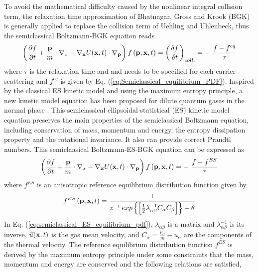 \documentclass{rsproca}%
\begin{document}
To avoid the mathematical difficulty caused by the nonlinear integral collision term, the relaxation time approximation of Bhatnagar, Gross and Krook (BGK) is generally applied to replace the collision term of Uehling and Uhlenbeck, thus the semiclassical Boltzmann-BGK equation reads
\begin{equation}
\left(\frac{\partial f}{\partial t}+\frac{\bf p}{m}\cdot {\bf\nabla }_x-{\bf \nabla}_{\bf x} U({\bf x},t)\cdot {\bf\nabla }_{\bf p}\right)f\left({\bf p},{\bf x},t\right) =\left(\frac{\delta f}{\delta t}\right)_{coll.}= -\ \frac{f-f^{eq}}{\tau }
\end{equation}
where $\tau$ is the relaxation time and and needs to be specified for each carrier scattering and $f^{eq}$ is given by Eq. (\ref{eq:Semiclassical_equilibrium_PDF}). Inspired by the classical ES kinetic model \cite{Holway1966} and using the maximum entropy principle, a new kinetic model equation has been proposed for dilute quantum gases in the normal phase \cite{Wu2012}.  This semiclassical ellipsoidal statistical (ES) kinetic model equation preserves the main properties of the semiclassical Boltzmann equation, including conservation of mass, momentum and energy, the entropy dissipation property and the rotational invariance.   It also can provide correct Prandtl numbers.   This semiclaasical Boltzmann-ES-BGK equation can be expressed as
\begin{equation}
\left(\frac{\partial f}{\partial t}+\frac{\bf p}{m}\cdot {\bf\nabla }_x-{\bf \nabla}_{\bf x} U({\bf x},t)\cdot {\bf\nabla }_{\bf p}\right)f\left({\bf p},{\bf x},t\right) = -\ \frac{f-f^{ES}}{\tau }
\label{eq:semiclassical_B_ESBGK}
\end{equation}
where $f^{ES}$ is an anisotropic reference equilibrium distribution function given by
\begin{equation}
f^{ES}\left({\bf p},{\bf x},t\right) =\frac{1}{z^{-1}\,exp\left\{{\left[ \frac{1}{2} \lambda_{\alpha \beta}^{-1} C_{\alpha} C_{\beta} \right]} \right\} -\theta }
\label{eq:semiclassical_ES_equilibrium_pdf}
\end{equation}
In Eq. (\ref{eq:semiclassical_ES_equilibrium_pdf}), $\lambda_{\alpha \beta}$ is a matrix and $\lambda_{\alpha \beta}^{-1}$ is its inverse, $\vec u({\bf x},t)$ is the gas mean velocity, and $C_{\alpha} = \frac{p_{\alpha}}{m} - u_{\alpha}$ are the components of the thermal velocity.
The reference equilibrium distribution function $f^{ES}$ is derived by the maximum entropy principle under some constraints that the mass, momentum and energy are conserved and the following relations are satisfied,
\end{document}
